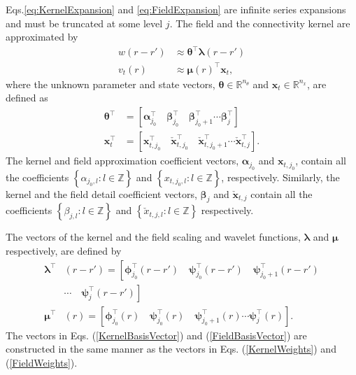 \documentclass[journal,a4paper]{IEEEtran}
\begin{document}
Eqs.\eqref{eq:KernelExpansion} and \eqref{eq:FieldExpansion} are infinite series expansions and must be truncated at some level $j$. The field and the connectivity kernel are approximated by
\begin{align}
	w\left(r-r'\right) &\approx \boldsymbol\theta^\top\boldsymbol\lambda\left(r-r'\right) 
	\label{eq:KernelFiniteExpansion} \\
	v_t\left(r\right) &\approx \boldsymbol\mu\left(r\right)^\top\mathbf{x}_t,
	\label{eq:FieldFiniteExpansion}
\end{align}
where the unknown parameter and state vectors, $\boldsymbol\theta \in \mathbb{R}^{n_{\theta}}$ and $\mathbf{x}_t \in \mathbb{R}^{n_x}$, are defined as 
\begin{align}
\boldsymbol\theta^\top &=\left[ \boldsymbol\alpha_{j_0}^\top \quad \boldsymbol\beta_{j_0}^\top \quad \boldsymbol\beta_{j_0+1}^\top \cdots \boldsymbol\beta_{j}^\top\right] 
\label{KernelWeights} \\
\mathbf{x}_{t}^\top &=\left[\mathbf{x}_{t,j_{0}}^\top \quad  \check{\mathbf{x}}_{t,j_{0}}^\top \quad  \check{\mathbf{x}}_{t,j_{0}+1}^\top \cdots \check{\mathbf{x}}_{t,j}^\top\right].
\label{FieldWeights}
\end{align}
The kernel and field approximation coefficient vectors, $\boldsymbol \alpha_{j_0}$ and $\mathbf{x}_{t,j_{0}}$, contain all the coefficients $\left\lbrace\alpha_{j_0, l}:l \in \mathbb{Z} \right\rbrace $ and $\left\lbrace x_{t,j_0, l}: l \in \mathbb{Z}\right\rbrace$, respectively. Similarly, the kernel and the field detail coefficient vectors, $\boldsymbol\beta_{j}$ and $\check{\mathbf{x}}_{t,j}$ contain all the coefficients $\left\lbrace \beta_{j,l} :l \in \mathbb{Z}\right\rbrace$ and $\left\lbrace  \check x_{t,j, l}:l \in \mathbb{Z}\right\rbrace$ respectively.

The vectors of the kernel and the field scaling and wavelet functions, $\boldsymbol\lambda$ and $\boldsymbol\mu$ respectively, are defined by
\begin{align}
 \boldsymbol\lambda^\top & (r-r')=\left[ \boldsymbol\phi_{j_0}^\top(r-r') \quad \boldsymbol\psi_{j_0}^\top(r-r') \quad \boldsymbol\psi_{j_0+1}^\top(r-r') \right. \nonumber \\
&\left. \cdots \quad \boldsymbol\psi_{j}^\top(r-r')\right] \label{KernelBasisVector} \\
 \boldsymbol\mu^\top & (r)=\left[ \boldsymbol\phi_{j_0}^\top(r) \quad \boldsymbol\psi_{j_0}^\top(r) \quad \boldsymbol\psi_{j_0+1}^\top(r) \cdots \boldsymbol\psi_{j}^\top(r) \right]. 
\label{FieldBasisVector}
\end{align}
The vectors in Eqs. (\ref{KernelBasisVector}) and (\ref{FieldBasisVector}) are constructed in the same manner as the vectors in Eqs. (\ref{KernelWeights}) and (\ref{FieldWeights}). 
 
\end{document}
